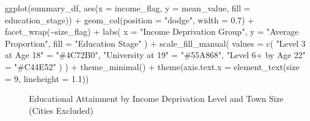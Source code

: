 \documentclass[11pt,en]{../tex/elegantpaper}
\newenvironment{Shaded}{\begin{snugshade}}{\end{snugshade}}
\newcommand{\AttributeTok}[1]{\textcolor[rgb]{0.77,0.63,0.00}{#1}}
\newcommand{\DecValTok}[1]{\textcolor[rgb]{0.00,0.00,0.81}{#1}}
\newcommand{\FloatTok}[1]{\textcolor[rgb]{0.00,0.00,0.81}{#1}}
\newcommand{\FunctionTok}[1]{\textcolor[rgb]{0.00,0.00,0.81}{#1}}
\newcommand{\NormalTok}[1]{#1}
\newcommand{\OtherTok}[1]{\textcolor[rgb]{0.50,0.00,0.50}{#1}}
\newcommand{\SpecialCharTok}[1]{\textcolor[rgb]{0.00,0.00,0.00}{#1}}
\newcommand{\StringTok}[1]{\textcolor[rgb]{0.31,0.60,0.02}{#1}}
\begin{document}
\begin{Shaded}
\begin{Highlighting}[]
\FunctionTok{ggplot}\NormalTok{(summary\_df, }\FunctionTok{aes}\NormalTok{(}\AttributeTok{x =}\NormalTok{ income\_flag, }\AttributeTok{y =}\NormalTok{ mean\_value, }\AttributeTok{fill =}\NormalTok{ education\_stage)) }\SpecialCharTok{+}
  \FunctionTok{geom\_col}\NormalTok{(}\AttributeTok{position =} \StringTok{"dodge"}\NormalTok{, }\AttributeTok{width =} \FloatTok{0.7}\NormalTok{) }\SpecialCharTok{+}
  \FunctionTok{facet\_wrap}\NormalTok{(}\SpecialCharTok{\textasciitilde{}}\NormalTok{size\_flag) }\SpecialCharTok{+}
  \FunctionTok{labs}\NormalTok{(}
    \AttributeTok{x =} \StringTok{"Income Deprivation Group"}\NormalTok{,}
    \AttributeTok{y =} \StringTok{"Average Proportion"}\NormalTok{,}
    \AttributeTok{fill =} \StringTok{"Education Stage"}
\NormalTok{  ) }\SpecialCharTok{+}
  \FunctionTok{scale\_fill\_manual}\NormalTok{(}
    \AttributeTok{values =} \FunctionTok{c}\NormalTok{(}
      \StringTok{"Level 3 at Age 18"} \OtherTok{=} \StringTok{"\#4C72B0"}\NormalTok{,}
      \StringTok{"University at 19"} \OtherTok{=} \StringTok{"\#55A868"}\NormalTok{,}
      \StringTok{"Level 6+ by Age 22"} \OtherTok{=} \StringTok{"\#C44E52"}
\NormalTok{    )}
\NormalTok{  ) }\SpecialCharTok{+}
  \FunctionTok{theme\_minimal}\NormalTok{() }\SpecialCharTok{+}
  \FunctionTok{theme}\NormalTok{(}\AttributeTok{axis.text.x =} \FunctionTok{element\_text}\NormalTok{(}\AttributeTok{size =} \DecValTok{9}\NormalTok{, }\AttributeTok{lineheight =} \FloatTok{1.1}\NormalTok{))}
\end{Highlighting}
\end{Shaded}

\begin{figure}[H]


\caption{\label{fig-income-education-by-size}Educational Attainment by
Income Deprivation Level and Town Size (Cities Excluded)}

\end{figure}%
\end{document}
